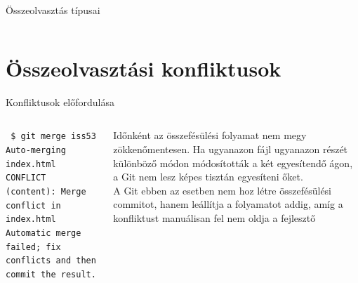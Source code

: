 \documentclass[english, aspectratio=169]{beamer}
\makeatletter
\let\origtableofcontents=\tableofcontents
\def\tableofcontents{\@ifnextchar[{\origtableofcontents}{\gobbletableofcontents}}
\def\gobbletableofcontents#1{\origtableofcontents}
\makeatother
\begin{document}
\begin{frame}{Összeolvasztás típusai}
\begin{columns}
\begin{column}{0.5\textwidth}
\begin{center}
\end{center}
\end{column}
\end{columns}
\end{frame}

\section{Összeolvasztási konfliktusok}

\begin{frame}
\tableofcontents[currentsection]
\end{frame}

\begin{frame}{Konfliktusok előfordulása}
\begin{columns}
\begin{column}{.5\textwidth}
\begin{footnotesize}
\begin{block}{}
\texttt{
\$ git merge iss53\\
Auto-merging index.html\\
CONFLICT (content): Merge conflict in index.html\\
Automatic merge failed; fix conflicts and then commit the result.\\}
\end{block}
\end{footnotesize}
\end{column}
\begin{column}{.5\textwidth}
Időnként az összefésülési folyamat nem megy zökkenőmentesen. Ha ugyanazon fájl ugyanazon részét különböző
módon módosították a két egyesítendő ágon, a Git nem lesz képes tisztán egyesíteni őket.\\
\vspace{0.2cm}
A Git ebben az esetben nem hoz létre összefésülési commitot, hanem leállítja a folyamatot addig, amíg a konfliktust
manuálisan fel nem oldja a fejlesztő
\end{column}
\end{columns}
\end{frame}
\end{document}
